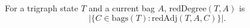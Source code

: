 For a trigraph state \(T\) and a current bag \(A\),
\(\mathrm{redDegree}(T,A)\) is
\[
  |\{C\in\mathrm{bags}(T) : \mathrm{redAdj}(T,A,C)\}|.
\]
